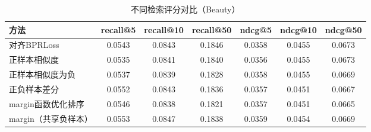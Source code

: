 \documentclass[12pt,a4paper]{article}
\begin{document}
\begin{CJK}{UTF8}{gbsn}
\begin{table}[H]
\centering
\caption{不同检索评分对比（Beauty）}
\begin{tabular}{lcccccc}
\toprule
方法 & recall@5 & recall@10 & recall@50 & ndcg@5 & ndcg@10 & ndcg@50 \\
\midrule
对齐BPRLoss & 0.0543 & 0.0843 & 0.1846 & 0.0358 & 0.0455 & 0.0673 \\
正样本相似度 & 0.0535 & 0.0841 & 0.1840 & 0.0356 & 0.0455 & 0.0673 \\
正样本相似度为负 & 0.0537 & 0.0839 & 0.1828 & 0.0358 & 0.0455 & 0.0669 \\
正负样本差分 & 0.0552 & 0.0843 & 0.1836 & 0.0357 & 0.0451 & 0.0667 \\
margin函数优化排序 & 0.0546 & 0.0838 & 0.1821 & 0.0357 & 0.0451 & 0.0665 \\
margin（共享负样本） & 0.0553 & 0.0847 & 0.1838 & 0.0359 & 0.0454 & 0.0669 \\
\bottomrule
\end{tabular}
\label{tab:beauty_retrieval_scores_compare}
\end{table}

\begin{table}[H]
\centering
\caption{不同拼接方式对比（Beauty）}
\small
\setlength{\tabcolsep}{4pt}
\label{tab:beauty_concat_method_compare}
\end{table}






\end{CJK}
\end{document}
